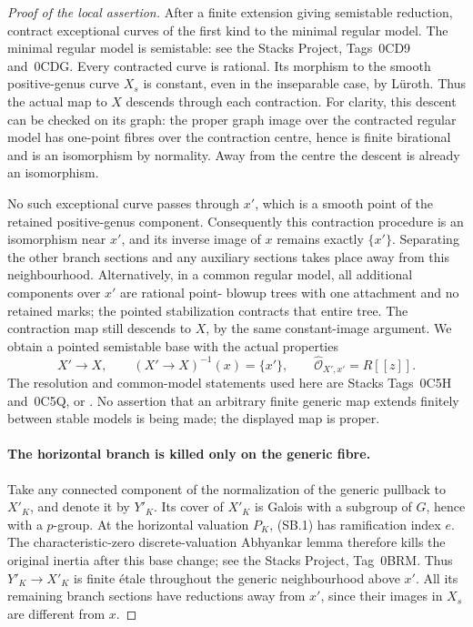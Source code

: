\begin{proof}[Proof of the local assertion]
After a finite extension giving semistable reduction,
contract exceptional curves of the first kind to the
minimal regular model. The minimal regular model is
semistable: see the Stacks Project, Tags~0CD9 and~0CDG.
Every contracted curve is rational. Its morphism to the
smooth positive-genus curve \(X_s\) is constant, even
in the inseparable case, by L\"uroth. Thus the actual map
to \(X\) descends through each contraction. For clarity,
this descent can be checked on its graph: the proper graph
image over the contracted regular model has one-point
fibres over the contraction centre, hence is finite
birational and is an isomorphism by normality. Away from
the centre the descent is already an isomorphism.

No such exceptional curve passes through \(x'\), which
is a smooth point of the retained positive-genus component.
Consequently this contraction procedure is an isomorphism
near \(x'\), and its inverse image of \(x\) remains
exactly \(\{x'\}\). Separating the other branch sections
and any auxiliary sections takes place away from this
neighbourhood. Alternatively, in a common regular model,
all additional components over \(x'\) are rational point-
blowup trees with one attachment and no retained marks;
the pointed stabilization contracts that entire tree.
The contraction map still descends to \(X\), by the same
constant-image argument. We obtain a pointed semistable
base with the actual properties
\[
 X'\longrightarrow X,\qquad (X'\longrightarrow X)^{-1}(x)
       =\{x'\},\qquad
 \widehat{\mathcal O}_{X',x'}=R[[z]].                    \tag{SB.2a}
\]
The resolution and common-model statements used here are
Stacks Tags~0C5H and~0C5Q, or
\cite[\S9.2 and \S10.3]{fghLiu}. No assertion that
an arbitrary finite generic map extends finitely between
stable models is being made; the displayed map is proper.

\paragraph{The horizontal branch is killed only on the generic fibre.}
Take any connected component of the normalization of the
generic pullback to \(X'_K\), and denote it by \(Y'_K\).
Its cover of \(X'_K\) is Galois with a subgroup of \(G\),
hence with a \(p\)-group. At the horizontal valuation
\(P_K\), (SB.1) has ramification index \(e\).
The characteristic-zero discrete-valuation Abhyankar lemma
therefore kills the original inertia after this base change;
see the Stacks Project, Tag~0BRM. Thus \(Y'_K\to X'_K\)
is finite \'etale throughout the generic neighbourhood
above \(x'\). All its remaining branch sections have
reductions away from \(x'\), since their images in \(X_s\)
are different from \(x\).


\end{proof}
